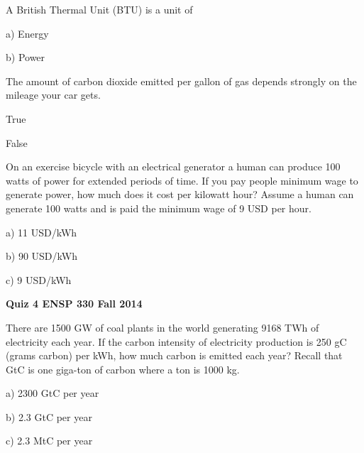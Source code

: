 \documentclass[12pt, oneside]{article}
\begin{document}
A British Thermal Unit (BTU) is a unit of

a) Energy

b) Power



\problem{}
The amount of carbon dioxide emitted per gallon of gas depends strongly
on the mileage your car gets.

True

False


\problem{}
On an exercise bicycle with an electrical generator a human
can produce 100 watts of power for extended periods of time.  If you pay
people minimum wage to generate power, how much does it cost per
kilowatt hour?  Assume a human can generate 100 watts and is paid the
minimum wage of 9 USD per hour.

a) 11 USD/kWh

b) 90 USD/kWh

c) 9 USD/kWh



\newpage
\setcounter{problem}{0}
{\bf Quiz 4 \hfill ENSP 330 \hfill Fall 2014}

\problem{}
There are 1500 GW of coal plants in the world generating 9168 TWh of
electricity each year.  If the carbon intensity of electricity
production is 250 gC (grams carbon) per kWh, how much carbon is emitted each year?
Recall that GtC is one giga-ton of carbon where a ton is 1000 kg.

a) 2300 GtC per year

b) 2.3 GtC per year

c) 2.3 MtC per year




\vspace{3.0cm}
\end{document}
